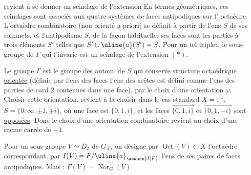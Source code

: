 revient à se donner un scindage de l'extension
En termes géométriques, ces scindages sont associés
aux quatre systèmes de  faces antipodiques sur l'
octaèdre.  L'octaèdre combinatoire (non orienté
a priori) se définit à partir de l'ens $S$ de
ses sommets, et l'antipodisme  $S$, de la façon
habituelle; ses faces sont les parties à trois éléments 
$S'$ telles que $S'\cup\uline{a}(S')=S$. Pour un tel triplet,
le sous-groupe de $\Gamma$ qui l'invarie est un scindage
de l'extension $(\ast)$.

Le groupe $\Gamma$ est le groupe des autom. de
$S$ qui conserve  structure octaédrique
\uline{orientée} (définie par l'ens  des  faces  l'ens
des arêtes  est défini comme l'ens des parties de
card 2 contenues dans une face), par le choix
d'une orientation $\omega$. Choisir cette orientation, revient 
à la choisir dans le cas standard $X=\mathbb P^1$, $S=\{0,\infty,\pm1,\pm i\}$,
où une face est $\{0,1,i\}$, et les faces  $\overrightarrow{\{0,1,i\}}$ et
$\overrightarrow{\{0,1,-i\}}$ sont \uline{opposées}. Donc le choix d'une orientation
combinatoire revient au choix d'une racine carrée de
$-1$.

Pour un sous-groupe $V\simeq D_2$ de $G_X$, on désigne
par $\operatorname{Oct}(V)\subset X$ l'octaèdre correspondant, par $I(V)=F/\uline{a}_{\unsure{I|F}}$
l'ens de ses paires de faces antipodiques. Mais : $\Gamma(V)=\operatorname{Nor}_G(V)$
